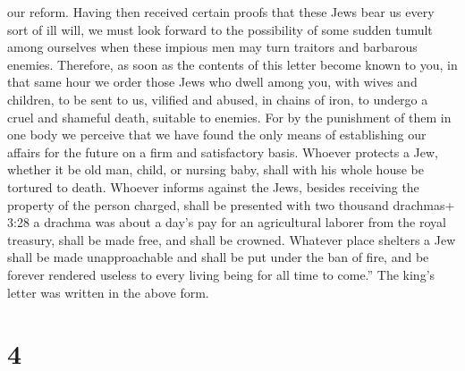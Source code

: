 our reform.  Having then received certain proofs that these
Jews bear us every sort of ill will, we must look forward to the
possibility of some sudden tumult among ourselves when these impious men
may turn traitors and barbarous enemies.  Therefore, as
soon as the contents of this letter become known to you, in that same
hour we order those Jews who dwell among you, with wives and children,
to be sent to us, vilified and abused, in chains of iron, to undergo a
cruel and shameful death, suitable to enemies.  For by the
punishment of them in one body we perceive that we have found the only
means of establishing our affairs for the future on a firm and
satisfactory basis.  Whoever protects a Jew, whether it be
old man, child, or nursing baby, shall with his whole house be tortured
to death.  Whoever informs against the Jews, besides
receiving the property of the person charged, shall be presented with
two thousand drachmas+ 3:28 a drachma was about a day's pay for an
agricultural laborer from the royal treasury, shall be made free, and
shall be crowned.  Whatever place shelters a Jew shall be
made unapproachable and shall be put under the ban of fire, and be
forever rendered useless to every living being for all time to come.''
 The king's letter was written in the above form.

\hypertarget{section-3}{%
\section{4}\label{section-3}}

